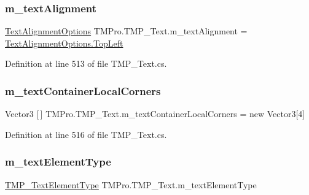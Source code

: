\subsubsection{\texorpdfstring{m\_textAlignment}{m\_textAlignment}}
{\footnotesize\ttfamily \mbox{\hyperlink{namespace_t_m_pro_a1dd743b58b1fd4057c00e4b98ab86301}{Text\+Alignment\+Options}} T\+M\+Pro.\+T\+M\+P\+\_\+\+Text.\+m\+\_\+text\+Alignment = \mbox{\hyperlink{namespace_t_m_pro_a1dd743b58b1fd4057c00e4b98ab86301ab32beb056fbfe36afbabc6c88c81ab36}{Text\+Alignment\+Options.\+Top\+Left}}\hspace{0.3cm}{\ttfamily [protected]}}



Definition at line 513 of file T\+M\+P\+\_\+\+Text.\+cs.

\mbox{\label{class_t_m_pro_1_1_t_m_p___text_a1ca1826bbe128f640c6a19a63d61f03d}} 
\subsubsection{\texorpdfstring{m\_textContainerLocalCorners}{m\_textContainerLocalCorners}}
{\footnotesize\ttfamily Vector3 \mbox{[}$\,$\mbox{]} T\+M\+Pro.\+T\+M\+P\+\_\+\+Text.\+m\+\_\+text\+Container\+Local\+Corners = new Vector3\mbox{[}4\mbox{]}\hspace{0.3cm}{\ttfamily [protected]}}



Definition at line 516 of file T\+M\+P\+\_\+\+Text.\+cs.

\mbox{\label{class_t_m_pro_1_1_t_m_p___text_a0db7b5499781e603016e27d8a433f28d}} 
\subsubsection{\texorpdfstring{m\_textElementType}{m\_textElementType}}
{\footnotesize\ttfamily \mbox{\hyperlink{namespace_t_m_pro_ab5662f47179bf1b81c575ecf80b24065}{T\+M\+P\+\_\+\+Text\+Element\+Type}} T\+M\+Pro.\+T\+M\+P\+\_\+\+Text.\+m\+\_\+text\+Element\+Type\hspace{0.3cm}{\ttfamily [protected]}}




